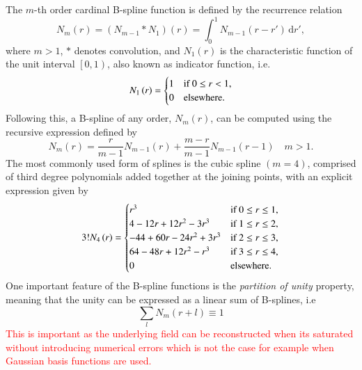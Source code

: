 \documentclass[review,authoryear,3p]{elsarticle}
\newcommand{\parham}[1]{\textcolor{red}{#1}}
\begin{document}
The $m$-th  order cardinal B-spline function is defined by the recurrence relation \citep{Chui1992} 
\begin{equation}
N_{m}\left(r\right) = \left(N_{m-1}\ast N_{1}\right)\left(r\right) = \int_0^{1} N_{m-1}\left( r-r'\right)\,\mathrm{d}r',
\label{SplineConvolutionIntegral}
\end{equation}
where $m>1$, $\ast$ denotes convolution, and $N_1\left(r\right)$ is the characteristic function of the unit interval $\left[ 0,1\right)$, also known as indicator function, i.e.
\begin{equation}
N_{1}\left(r\right)=
\begin{cases}
1 & \text{if $ 0\le r<1$}, \\
0 & \mathrm{elsewhere}.
\end{cases}
\end{equation}
Following this, a B-spline of any order, $N_m(r)$, can be computed using the recursive expression defined by \citep{DeBoor2001}
\begin{equation}\label{eq:MRA-DoBoorFormula}
 N_{m}\left(r\right)=\frac{r}{m-1}N_{m-1}\left(r\right)+\frac{m-r}{m-1}N_{m-1}\left(r-1\right) \quad m>1.
 \end{equation}
The most commonly used form of splines is the cubic spline $\left(m=4\right)$, comprised of third degree polynomials added together at the joining points, with an explicit expression given by
\begin{align}
3!N_{4}\left(r\right)=
\begin{cases}
r^3 & \text{if $ 0\le r\le1$}, \\
4-12r+12r^2-3r^3 & \text{if $1\le r\le2$}, \\
-44+60r-24r^2+3r^3 & \text{if $2\le r\le3$}, \\
64-48r+12r^2-r^3 & \text{if $3\le r\le4$}, \\
0 & \mathrm{elsewhere}.
\end{cases}
\end{align}
One important feature of the B-spline functions is the \emph{partition of unity} property, meaning that the unity can be expressed as a linear sum of B-splines, i.e
\begin{equation}
	\sum_{l}N_m(r+l)\equiv1
	\end{equation}
	\parham{This is important as the underlying field can be reconstructed when its saturated without introducing numerical errors which is not the case for example when Gaussian basis functions are used.}
	
\end{document}
